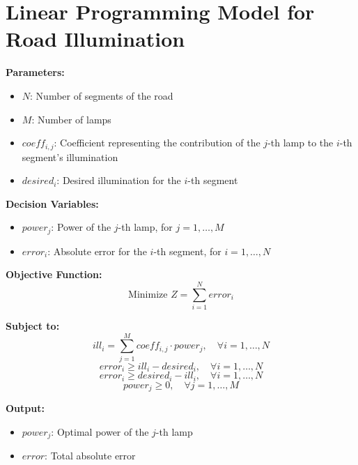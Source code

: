 \documentclass{article}
\begin{document}
\section*{Linear Programming Model for Road Illumination}

\textbf{Parameters:}
\begin{itemize}
    \item $N$: Number of segments of the road
    \item $M$: Number of lamps
    \item $coeff_{i,j}$: Coefficient representing the contribution of the $j$-th lamp to the $i$-th segment's illumination
    \item $desired_i$: Desired illumination for the $i$-th segment
\end{itemize}

\textbf{Decision Variables:}
\begin{itemize}
    \item $power_j$: Power of the $j$-th lamp, for $j = 1, \ldots, M$
    \item $error_i$: Absolute error for the $i$-th segment, for $i = 1, \ldots, N$
\end{itemize}

\textbf{Objective Function:}
\[
\text{Minimize } Z = \sum_{i=1}^{N} error_i
\]

\textbf{Subject to:}
\[
ill_i = \sum_{j=1}^{M} coeff_{i,j} \cdot power_j, \quad \forall i = 1, \ldots, N
\]
\[
error_i \geq ill_i - desired_i, \quad \forall i = 1, \ldots, N
\]
\[
error_i \geq desired_i - ill_i, \quad \forall i = 1, \ldots, N
\]
\[
power_j \geq 0, \quad \forall j = 1, \ldots, M
\]

\textbf{Output:}
\begin{itemize}
    \item $power_j$: Optimal power of the $j$-th lamp
    \item $error$: Total absolute error
\end{itemize}
\end{document}
